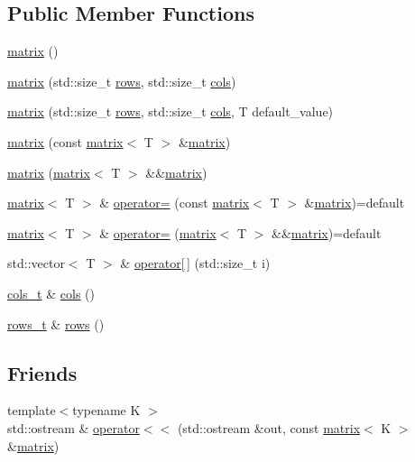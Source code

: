 \subsection*{Public Member Functions}
\begin{DoxyCompactItemize}
\item 
\hyperlink{classmatrix_a5bbbb47321f32b546b272239ab6c007b}{matrix} ()
\item 
\hyperlink{classmatrix_a4088152f855ecba4ca11b74798d1d60c}{matrix} (std\-::size\-\_\-t \hyperlink{classmatrix_ab0de11dcf04826c3923231b3a1510798}{rows}, std\-::size\-\_\-t \hyperlink{classmatrix_a6734db1df79566355669fc34c0bedb15}{cols})
\item 
\hyperlink{classmatrix_a864ad1444a5f1f40dcf67288f19887e9}{matrix} (std\-::size\-\_\-t \hyperlink{classmatrix_ab0de11dcf04826c3923231b3a1510798}{rows}, std\-::size\-\_\-t \hyperlink{classmatrix_a6734db1df79566355669fc34c0bedb15}{cols}, T default\-\_\-value)
\item 
\hyperlink{classmatrix_a83dcebf4c4f051a73adc86704e302767}{matrix} (const \hyperlink{classmatrix}{matrix}$<$ T $>$ \&\hyperlink{classmatrix}{matrix})
\item 
\hyperlink{classmatrix_a4df13087198b66e082767f7046b46970}{matrix} (\hyperlink{classmatrix}{matrix}$<$ T $>$ \&\&\hyperlink{classmatrix}{matrix})
\item 
\hyperlink{classmatrix}{matrix}$<$ T $>$ \& \hyperlink{classmatrix_aad5cc1e2ebb53530b38932a04db885d6}{operator=} (const \hyperlink{classmatrix}{matrix}$<$ T $>$ \&\hyperlink{classmatrix}{matrix})=default
\item 
\hyperlink{classmatrix}{matrix}$<$ T $>$ \& \hyperlink{classmatrix_a1187045259c4beaecf56b22c9ec4b840}{operator=} (\hyperlink{classmatrix}{matrix}$<$ T $>$ \&\&\hyperlink{classmatrix}{matrix})=default
\item 
std\-::vector$<$ T $>$ \& \hyperlink{classmatrix_a9e8d88c7653605e38fa4804c86769814}{operator\mbox{[}$\,$\mbox{]}} (std\-::size\-\_\-t i)
\item 
\hyperlink{classmatrix_a33705bb22bd2ff26ab7e8af05f15569e}{cols\-\_\-t} \& \hyperlink{classmatrix_a6734db1df79566355669fc34c0bedb15}{cols} ()
\item 
\hyperlink{classmatrix_af8b068298be5fe588a7911bf82fc82bb}{rows\-\_\-t} \& \hyperlink{classmatrix_ab0de11dcf04826c3923231b3a1510798}{rows} ()
\end{DoxyCompactItemize}
\subsection*{Friends}
\begin{DoxyCompactItemize}
\item 
{\footnotesize template$<$typename K $>$ }\\std\-::ostream \& \hyperlink{classmatrix_ade94c5f75351c6706344ab0cfc7a0e39}{operator$<$$<$} (std\-::ostream \&out, const \hyperlink{classmatrix}{matrix}$<$ K $>$ \&\hyperlink{classmatrix}{matrix})
\end{DoxyCompactItemize}


